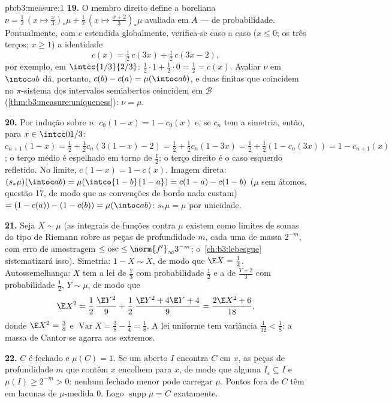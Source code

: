 \begin{solution}{pb:b3:measure:1}
\textbf{19.} O membro direito define a  boreliana
$\nu = \frac12\,(x \mapsto \tfrac x3)_*\mu + \frac12\,(x
\mapsto \tfrac{x+2}3)_*\mu$ avaliada em $A$ ---  de
probabilidade. Pontualmente, com $c$ estendida globalmente, verifica-se
caso a caso ($x \leq 0$; os três terços; $x \geq 1$) a
identidade
\[
c(x) = \tfrac12\,c(3x) + \tfrac12\,c(3x - 2),
\]
por exemplo, em $\intcc{1/3}{2/3}$: $\frac12\cdot1 + \frac12\cdot0 =
\frac12 = c(x)$. Avaliar $\nu$ em $\intoc ab$ dá, portanto,
$c(b) - c(a) = \mu(\intoc ab)$, e duas  finitas que
coincidem no $\pi$-sistema dos intervalos semiabertos coincidem
em $\mathcal B$ (\cref{thm:b3:measure:uniqueness}): $\nu =
\mu$.

\textbf{20.} Por indução sobre $n$: $c_0(1-x) = 1 - c_0(x)$
e, se $c_n$ tem a simetria, então, para $x \in
\intcc0{1/3}$: $c_{n+1}(1 - x) = \frac12 + \frac12c_n(3(1-x)
- 2) = \frac12 + \frac12c_n(1 - 3x) = \frac12 + \frac12(1 -
c_n(3x)) = 1 - c_{n+1}(x)$; o terço médio é espelhado em torno de
$\frac12$; o terço direito é o caso esquerdo refletido. No
limite, $c(1-x) = 1 - c(x)$. Imagem direta: $(s_*\mu)(\intoc ab)
= \mu(\intco{1-b}{1-a}) = c(1-a) - c(1-b)$ ($\mu$ sem átomos,
questão 17, de modo que as convenções de bordo nada custam) $= (1 -
c(a)) - (1 - c(b)) = \mu(\intoc ab)$: $s_*\mu = \mu$ por
unicidade.

\textbf{21.} Seja $X \sim \mu$ (as integrais de funções
 contra $\mu$ existem como limites de somas do tipo de Riemann
sobre as peças de profundidade $m$, cada uma de massa $2^{-m}$, com
erro de amostragem $\leq \operatorname{osc} \leq
\norm{f'}_\infty3^{-m}$; o~\cref{ch:b3:lebesgue}
sistematizará isso). Simetria: $1 - X \sim X$, de modo que $\E X =
\frac12$. Autossemelhança: $X$ tem a lei de $\frac Y3$ com
probabilidade $\frac12$ e a de $\frac{Y+2}3$ com probabilidade
$\frac12$, $Y \sim \mu$, de modo que
\[
\E X^2 = \frac12\,\frac{\E Y^2}9 + \frac12\,
\frac{\E Y^2 + 4\E Y + 4}{9} = \frac{2\E X^2 + 6}{18},
\]
donde $\E X^2 = \frac38$ e $\operatorname{Var}X = \frac38
- \frac14 = \frac18$. A lei uniforme tem variância
$\frac1{12} < \frac18$: a massa de Cantor se agarra aos extremos.

\textbf{22.} $C$ é fechado e $\mu(C) = 1$. Se um aberto $I$
encontra $C$ em $x$, as peças de profundidade $m$ que contêm $x$ encolhem
para $x$, de modo que alguma $I_\varepsilon \subseteq I$ e $\mu(I) \geq
2^{-m} > 0$: nenhum fechado menor pode carregar $\mu$. Pontos
fora de $C$ têm  em lacunas de $\mu$-medida $0$. Logo
$\operatorname{supp}\mu = C$ exatamente.


\end{solution}
